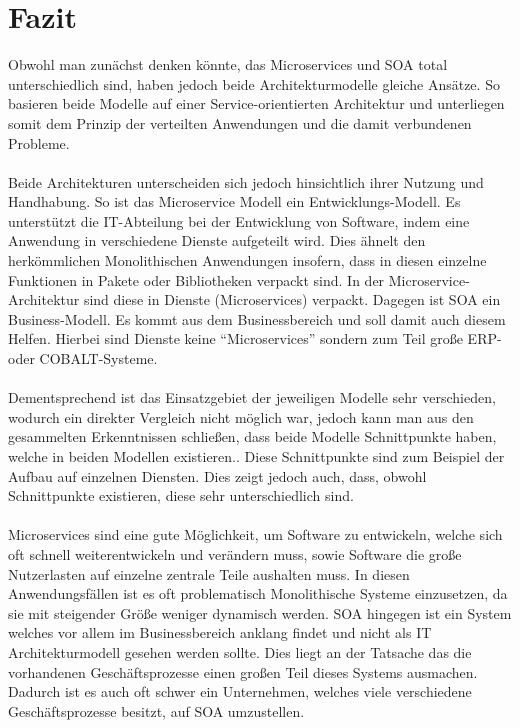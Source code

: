 \section{Fazit}
\label{sec:Fazit}
Obwohl man zunächst denken könnte, das Microservices und SOA total unterschiedlich sind, haben jedoch beide Architekturmodelle gleiche Ansätze. So basieren beide Modelle auf einer Service-orientierten Architektur und unterliegen somit dem Prinzip der verteilten Anwendungen und die damit verbundenen Probleme.
\\\\
Beide Architekturen unterscheiden sich jedoch hinsichtlich ihrer Nutzung und Handhabung. So ist das Microservice Modell ein Entwicklungs-Modell. Es unterstützt die IT-Abteilung bei der Entwicklung von Software, indem eine Anwendung in verschiedene Dienste aufgeteilt wird. Dies ähnelt den herkömmlichen Monolithischen Anwendungen insofern, dass in diesen einzelne Funktionen in Pakete oder Bibliotheken verpackt sind. In der Microservice-Architektur sind diese in Dienste (Microservices) verpackt. Dagegen ist SOA ein Business-Modell. Es kommt aus dem Businessbereich und soll damit auch diesem Helfen. Hierbei sind Dienste keine "`Microservices"' sondern zum Teil große ERP- oder COBALT-Systeme.
\\\\
Dementsprechend ist das Einsatzgebiet der jeweiligen Modelle sehr verschieden, wodurch ein direkter Vergleich nicht möglich war, jedoch kann man aus den gesammelten Erkenntnissen schließen, dass beide Modelle  Schnittpunkte haben, welche in beiden Modellen existieren.. Diese Schnittpunkte sind zum Beispiel der Aufbau auf einzelnen Diensten. Dies zeigt jedoch auch, dass, obwohl Schnittpunkte existieren, diese sehr unterschiedlich sind.
\\\\
Microservices sind eine gute Möglichkeit, um Software zu entwickeln, welche sich oft schnell weiterentwickeln und verändern muss, sowie Software die große Nutzerlasten auf einzelne zentrale Teile aushalten muss. In diesen Anwendungsfällen ist es oft problematisch Monolithische Systeme einzusetzen, da sie mit steigender Größe weniger dynamisch werden.
SOA hingegen ist ein System welches vor allem im Businessbereich anklang findet und nicht als IT Architekturmodell gesehen werden sollte. Dies liegt an der Tatsache das die vorhandenen Geschäftsprozesse einen großen Teil dieses Systems ausmachen. Dadurch ist es auch oft schwer ein Unternehmen, welches viele verschiedene Geschäftsprozesse besitzt, auf SOA umzustellen.
